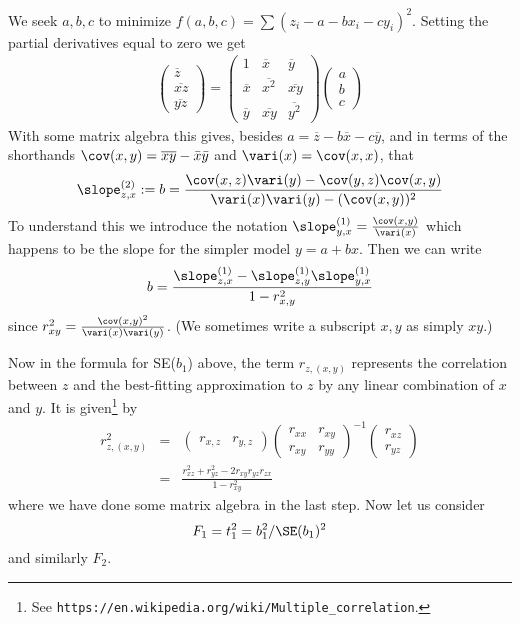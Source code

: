 We seek $a,b,c$ to minimize $f(a,b,c)=\sum (z_i-a-bx_i-cy_i)^2$.
Setting the partial derivatives equal to zero we get
\begin{eqnarray*}
\begin{pmatrix} \overline z \\ \overline{xz} \\ \overline{yz}\end{pmatrix} = \begin{pmatrix}
	1 & \overline x & \overline y \\
	\overline x & \overline{x^2} & \overline{xy} \\
	\overline y & \overline{xy} & \overline{y^2}
\end{pmatrix}
\begin{pmatrix}
a \\ b\\ c
\end{pmatrix}
\end{eqnarray*}
With some matrix algebra this gives, besides $a=\overline z-b\overline x-c\overline y$, and in terms of the shorthands $\cov(x,y)=\overline{xy}-\bar x\bar y$ and $\vari(x)=\cov(x,x)$, that
\[
	\slope^{(2)}_{z,x} := b = \frac{\cov(x,z)\vari(y)-\cov(y,z)\cov(x,y)}{\vari(x)\vari(y)-(\cov(x,y))^2}
\]
To understand this we introduce the notation $\slope^{(1)}_{y,x} = \frac{\cov(x,y)}{\vari(x)}$ which happens to be the slope for the simpler model $y=a+bx$.
Then we can write
\[
	b = \frac{\slope^{(1)}_{z,x} - \slope^{(1)}_{z,y} \slope^{(1)}_{y,x}}{1-r^2_{x,y}}
\]
since $r_{xy}^2=\frac{\cov(x,y)^2}{\vari(x)\vari(y)}$. (We sometimes write a subscript $x,y$ as simply $xy$.)

Now in the formula for SE($b_1$) above, the term $r_{z,(x,y)}$ represents the correlation between $z$ and the best-fitting approximation to $z$ by any linear combination of $x$ and $y$. It is given\footnote{
	See \texttt{https://en.wikipedia.org/wiki/Multiple\_correlation}.
} by
\begin{eqnarray*}
	r^2_{z,(x,y)} &=& \begin{pmatrix} r_{x,z} & r_{y,z}\end{pmatrix} \begin{pmatrix} r_{xx}& r_{xy} \\ r_{xy} & r_{yy} \end{pmatrix}^{-1} \begin{pmatrix} r_{xz}\\ r_{yz}\end{pmatrix}\\
	&=&\frac{r_{xz}^2+r_{yz}^2-2r_{xy}r_{yz}r_{zx}}{1-r_{xy}^2}
\end{eqnarray*}
where we have done some matrix algebra in the last step.
Now let us consider
\[
	F_1 = t_1^2 = b_1^2/\SE(b_1)^2
\]
and similarly $F_2$.

